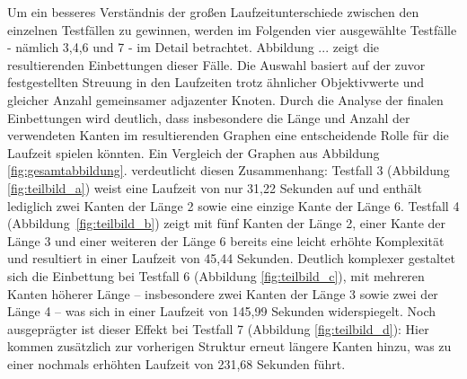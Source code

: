 \documentclass[bachelor, german]{algothesis}
\begin{document}
Um ein besseres Verständnis der großen Laufzeitunterschiede zwischen den einzelnen Testfällen zu gewinnen, werden im Folgenden vier ausgewählte Testfälle - nämlich 3,4,6 und 7 - im Detail betrachtet. Abbildung ... zeigt die resultierenden Einbettungen dieser Fälle. Die Auswahl basiert auf der zuvor festgestellten Streuung in den Laufzeiten trotz ähnlicher Objektivwerte und gleicher Anzahl gemeinsamer adjazenter Knoten. Durch die Analyse der finalen Einbettungen wird deutlich, dass insbesondere die Länge und Anzahl der verwendeten Kanten im resultierenden Graphen eine entscheidende Rolle für die Laufzeit spielen könnten.\newline 
Ein Vergleich der Graphen aus Abbildung \ref{fig:gesamtabbildung}. verdeutlicht diesen Zusammenhang: Testfall 3 (Abbildung \ref{fig:teilbild_a}) weist eine Laufzeit von nur 31,22 Sekunden auf und enthält lediglich zwei Kanten der Länge 2 sowie eine einzige Kante der Länge 6. Testfall 4 (Abbildung~\ref{fig:teilbild_b}) zeigt mit fünf Kanten der Länge 2, einer Kante der Länge 3 und einer weiteren der Länge 6 bereits eine leicht erhöhte Komplexität und resultiert in einer Laufzeit von 45,44 Sekunden. Deutlich komplexer gestaltet sich die Einbettung bei Testfall 6 (Abbildung \ref{fig:teilbild_c}), mit mehreren Kanten höherer Länge – insbesondere zwei Kanten der Länge 3 sowie zwei der Länge 4 – was sich in einer Laufzeit von 145,99 Sekunden widerspiegelt. Noch ausgeprägter ist dieser Effekt bei Testfall 7 (Abbildung \ref{fig:teilbild_d}): Hier kommen zusätzlich zur vorherigen Struktur erneut längere Kanten hinzu, was zu einer nochmals erhöhten Laufzeit von 231,68 Sekunden führt.
\end{document}
